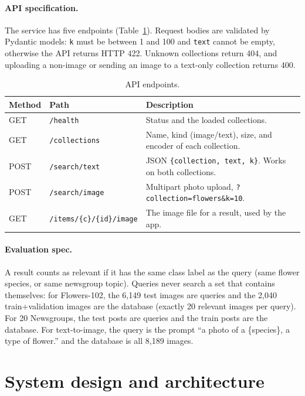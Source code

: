 \documentclass{article}
\begin{document}
\paragraph{API specification.} The service has five endpoints (Table~\ref{tab:api}). Request bodies are validated by Pydantic models: \texttt{k} must be between 1 and 100 and \texttt{text} cannot be empty, otherwise the API returns HTTP 422. Unknown collections return 404, and uploading a non-image or sending an image to a text-only collection returns 400.

\begin{table}[h]
\centering\small
\caption{API endpoints.}
\label{tab:api}
\begin{tabular}{@{}llp{6.6cm}@{}}
\toprule
Method & Path & Description \\
\midrule
GET & \texttt{/health} & Status and the loaded collections. \\
GET & \texttt{/collections} & Name, kind (image/text), size, and encoder of each collection. \\
POST & \texttt{/search/text} & JSON \texttt{\{collection, text, k\}}. Works on both collections. \\
POST & \texttt{/search/image} & Multipart photo upload, \texttt{?collection=flowers\&k=10}. \\
GET & \texttt{/items/\{c\}/\{id\}/image} & The image file for a result, used by the app. \\
\bottomrule
\end{tabular}
\end{table}

\paragraph{Evaluation spec.} A result counts as relevant if it has the same class label as the query (same flower species, or same newsgroup topic). Queries never search a set that contains themselves: for Flowers-102, the 6,149 test images are queries and the 2,040 train+validation images are the database (exactly 20 relevant images per query). For 20 Newsgroups, the test posts are queries and the train posts are the database. For text-to-image, the query is the prompt ``a photo of a \{species\}, a type of flower.'' and the database is all 8,189 images.

\section{System design and architecture}
\end{document}
